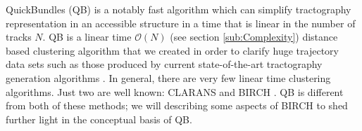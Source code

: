 \documentclass[preprint,authoryear,a4paper,10pt,onecolumn]{elsarticle}
\begin{document}
\begin{appendices}




QuickBundles (QB) is a notably fast algorithm which can simplify
tractography representation in an accessible structure in a time that is
linear in the number of tracks $N$. QB is a linear time $\mathcal{O}(N)$ (see
section \ref{sub:Complexity}) distance based clustering algorithm that
we created in order to clarify huge trajectory data sets such as those
produced by current state-of-the-art tractography generation algorithms
\citep{Parker2003,WWS+08}. In general, there are very few linear time
clustering algorithms. Just two are well known: CLARANS
\citep{ng2002clarans} and BIRCH \citep{zhang1997birch}. QB is different
from both of these methods; we will describing some
aspects of BIRCH to shed further light in the conceptual basis of QB.


\end{appendices}
\end{document}
